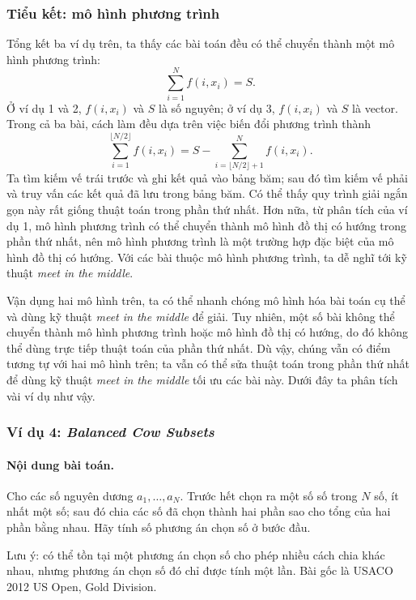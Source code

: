 \documentclass[11pt]{article}
\begin{document}
\subsubsection{Tiểu kết: mô hình phương trình}

Tổng kết ba ví dụ trên, ta thấy các bài toán đều có thể chuyển thành một mô
hình phương trình:
\[
  \sum_{i=1}^{N} f(i,x_i)=S.
\]
Ở ví dụ 1 và 2, \(f(i,x_i)\) và \(S\) là số nguyên; ở ví dụ 3,
\(f(i,x_i)\) và \(S\) là vector. Trong cả ba bài, cách làm đều dựa trên việc
biến đổi phương trình thành
\[
  \sum_{i=1}^{\lfloor N/2\rfloor} f(i,x_i)
  =
  S-\sum_{i=\lfloor N/2\rfloor+1}^{N} f(i,x_i).
\]
Ta tìm kiếm vế trái trước và ghi kết quả vào bảng băm; sau đó tìm kiếm vế
phải và truy vấn các kết quả đã lưu trong bảng băm. Có thể thấy quy trình
giải ngắn gọn này rất giống thuật toán trong phần thứ nhất. Hơn nữa, từ phân
tích của ví dụ 1, mô hình phương trình có thể chuyển thành mô hình đồ thị có
hướng trong phần thứ nhất, nên mô hình phương trình là một trường hợp đặc
biệt của mô hình đồ thị có hướng. Với các bài thuộc mô hình phương trình, ta
dễ nghĩ tới kỹ thuật \emph{meet in the middle}.

Vận dụng hai mô hình trên, ta có thể nhanh chóng mô hình hóa bài toán cụ thể
và dùng kỹ thuật \emph{meet in the middle} để giải. Tuy nhiên, một số bài
không thể chuyển thành mô hình phương trình hoặc mô hình đồ thị có hướng, do
đó không thể dùng trực tiếp thuật toán của phần thứ nhất. Dù vậy, chúng vẫn
có điểm tương tự với hai mô hình trên; ta vẫn có thể sửa thuật toán trong
phần thứ nhất để dùng kỹ thuật \emph{meet in the middle} tối ưu các bài này.
Dưới đây ta phân tích vài ví dụ như vậy.

\subsubsection{Ví dụ 4: \emph{Balanced Cow Subsets}}

\paragraph{Nội dung bài toán.}
Cho các số nguyên dương \(a_1,\ldots,a_N\). Trước hết chọn ra một số số trong
\(N\) số, ít nhất một số; sau đó chia các số đã chọn thành hai phần sao cho
tổng của hai phần bằng nhau. Hãy tính số phương án chọn số ở bước đầu.

Lưu ý: có thể tồn tại một phương án chọn số cho phép nhiều cách chia khác
nhau, nhưng phương án chọn số đó chỉ được tính một lần. Bài gốc là USACO 2012
US Open, Gold Division.
\end{document}
